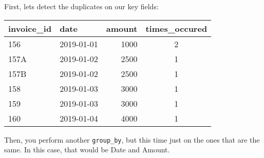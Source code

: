 \documentclass[
]{book}
\newenvironment{Shaded}{\begin{snugshade}}{\end{snugshade}}
\newcommand{\CommentTok}[1]{\textcolor[rgb]{0.56,0.35,0.01}{\textit{#1}}}
\newcommand{\DataTypeTok}[1]{\textcolor[rgb]{0.13,0.29,0.53}{#1}}
\newcommand{\DecValTok}[1]{\textcolor[rgb]{0.00,0.00,0.81}{#1}}
\newcommand{\KeywordTok}[1]{\textcolor[rgb]{0.13,0.29,0.53}{\textbf{#1}}}
\newcommand{\NormalTok}[1]{#1}
\newcommand{\OperatorTok}[1]{\textcolor[rgb]{0.81,0.36,0.00}{\textbf{#1}}}
\newcommand{\StringTok}[1]{\textcolor[rgb]{0.31,0.60,0.02}{#1}}
\begin{document}
First, lets detect the duplicates on our key fields:

\begin{Shaded}
\end{Shaded}

\captionsetup[table]{labelformat=empty,skip=1pt}
\begin{longtable}{llrc}
\toprule
invoice\_id & date & amount & times\_occured \\ 
\midrule
156 & 2019-01-01 & 1000 & 2 \\ 
157A & 2019-01-02 & 2500 & 1 \\ 
157B & 2019-01-02 & 2500 & 1 \\ 
158 & 2019-01-03 & 3000 & 1 \\ 
159 & 2019-01-03 & 3000 & 1 \\ 
160 & 2019-01-04 & 4000 & 1 \\ 
\bottomrule
\end{longtable}

Then, you perform another \texttt{group\_by}, but this time just on the ones that are the same. In this case, that would be Date and Amount.

\begin{Shaded}
\end{Shaded}
\end{document}
